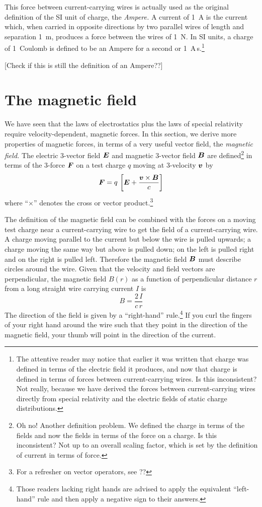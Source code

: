 This force between current-carrying wires is actually used as the
original definition of the SI unit of charge, the {\em Ampere.\/} A
current of 1~A is the current which, when carried in opposite
directions by two parallel wires of length and separation 1~m,
produces a force between the wires of 1~N.  In SI units, a charge of
1~Coulomb is defined to be an Ampere for a second or
1~A\,s.\footnote{The attentive reader may notice that earlier it was
written that charge was defined in terms of the electric field it
produces, and now that charge is defined in terms of forces between
current-carrying wires.  Is this inconsistent?  Not really, because we
have derived the forces between current-carrying wires directly from
special relativity and the electric fields of static charge
distributions.}

[Check if this is still the definition of an Ampere??]


\section{The magnetic field}

We have seen that the laws of electrostatics plus the laws of special
relativity require velocity-dependent, magnetic forces. In this
section, we derive more properties of magnetic forces, in terms of a
very useful vector field, the {\em magnetic field.\/} The electric
3-vector field $\mbox{\boldmath $E$}$ and magnetic 3-vector field $\mbox{\boldmath $B$}$ are
defined\footnote{Oh no!  Another definition problem.  We defined the
charge in terms of the fields and now the fields in terms of the force
on a charge.  Is this inconsistent?  Not up to an overall scaling
factor, which is set by the definition of current in terms of force.}
in terms of the 3-force $\mbox{\boldmath $F$}$ on a test charge $q$ moving at
3-velocity $\mbox{\boldmath $v$}$ by
\begin{equation}
\mbox{\boldmath $F$}=q\,\left[\mbox{\boldmath $E$}+\frac{\mbox{\boldmath $v$}\times\mbox{\boldmath $B$}}{c}\right]
\end{equation}
where ``$\times$'' denotes the cross or vector product.\footnote{For a
refresher on vector operators, see ??}

The definition of the magnetic field can be combined with the forces
on a moving test charge near a current-carrying wire to get the field
of a current-carrying wire.  A charge moving parallel to the current
but below the wire is pulled upwards; a charge moving the same way but
above is pulled down; on the left is pulled right and on the right is
pulled left.  Therefore the magnetic field $\mbox{\boldmath $B$}$ must describe
circles around the wire.  Given that the velocity and field vectors
are perpendicular, the magnetic field $B(r)$ as a function of
perpendicular distance $r$ from a long straight wire carrying current
$I$ is
\begin{equation}
B=\frac{2\,I}{c\,r}
\end{equation}
The direction of the field is given by a ``right-hand''
rule.\footnote{Those readers lacking right hands are advised to apply
the equivalent ``left-hand'' rule and then apply a negative sign to
their answers.}  If you curl the fingers of your right hand around the
wire such that they point in the direction of the magnetic field, your
thumb will point in the direction of the current.

